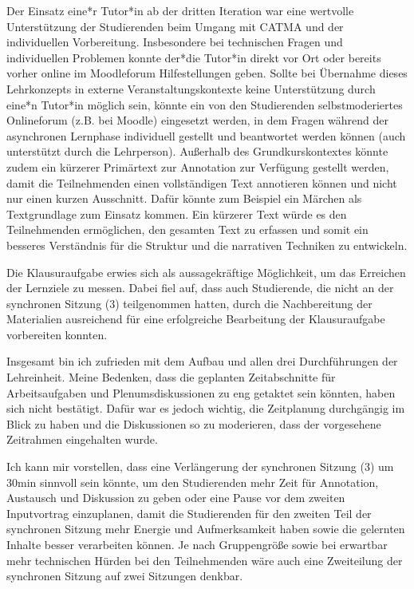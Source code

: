 \documentclass[
          a4paper,
        ]{article}
\begin{document}
Der Einsatz eine*r Tutor*in ab der dritten Iteration war eine wertvolle
Unterstützung der Studierenden beim Umgang mit CATMA und der
individuellen Vorbereitung. Insbesondere bei technischen Fragen und
individuellen Problemen konnte der*die Tutor*in direkt vor Ort oder
bereits vorher online im Moodleforum Hilfestellungen geben. Sollte bei
Übernahme dieses Lehrkonzepts in externe Veranstaltungskontexte keine
Unterstützung durch eine*n Tutor*in möglich sein, könnte ein von den
Studierenden selbstmoderiertes Onlineforum (z.B. bei Moodle) eingesetzt
werden, in dem Fragen während der asynchronen Lernphase individuell
gestellt und beantwortet werden können (auch unterstützt durch die
Lehrperson). Außerhalb des Grundkurskontextes könnte zudem ein kürzerer
Primärtext zur Annotation zur Verfügung gestellt werden, damit die
Teilnehmenden einen vollständigen Text annotieren können und nicht nur
einen kurzen Ausschnitt. Dafür könnte zum Beispiel ein Märchen als
Textgrundlage zum Einsatz kommen. Ein kürzerer Text würde es den
Teilnehmenden ermöglichen, den gesamten Text zu erfassen und somit ein
besseres Verständnis für die Struktur und die narrativen Techniken zu
entwickeln.

Die Klausuraufgabe erwies sich als aussagekräftige Möglichkeit, um das
Erreichen der Lernziele zu messen. Dabei fiel auf, dass auch
Studierende, die nicht an der synchronen Sitzung (3) teilgenommen
hatten, durch die Nachbereitung der Materialien ausreichend für eine
erfolgreiche Bearbeitung der Klausuraufgabe vorbereiten konnten.

Insgesamt bin ich zufrieden mit dem Aufbau und allen drei Durchführungen
der Lehreinheit. Meine Bedenken, dass die geplanten Zeitabschnitte für
Arbeitsaufgaben und Plenumsdiskussionen zu eng getaktet sein könnten,
haben sich nicht bestätigt. Dafür war es jedoch wichtig, die Zeitplanung
durchgängig im Blick zu haben und die Diskussionen so zu moderieren,
dass der vorgesehene Zeitrahmen eingehalten wurde.

Ich kann mir vorstellen, dass eine Verlängerung der synchronen Sitzung
(3) um 30min sinnvoll sein könnte, um den Studierenden mehr Zeit für
Annotation, Austausch und Diskussion zu geben oder eine Pause vor dem
zweiten Inputvortrag einzuplanen, damit die Studierenden für den zweiten
Teil der synchronen Sitzung mehr Energie und Aufmerksamkeit haben sowie
die gelernten Inhalte besser verarbeiten können. Je nach Gruppengröße
sowie bei erwartbar mehr technischen Hürden bei den Teilnehmenden wäre
auch eine Zweiteilung der synchronen Sitzung auf zwei Sitzungen denkbar.
\end{document}
